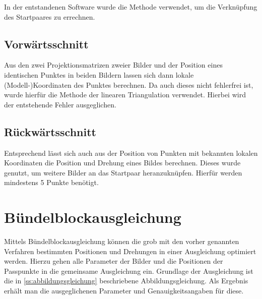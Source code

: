 \documentclass[./00PhotoBox.tex]{subfiles}
\begin{document}
In der entstandenen Software wurde die Methode verwendet, um die Verknüpfung des Startpaares zu errechnen.

\subsection{Vorwärtsschnitt}
Aus den zwei Projektionsmatrizen zweier Bilder und der Position eines identischen Punktes in beiden Bildern lassen sich dann lokale (Modell-)Koordinaten des Punktes berechnen. Da auch dieses nicht fehlerfrei ist, wurde hierfür die Methode der linearen Triangulation verwendet. Hierbei wird der entstehende Fehler ausgeglichen. \citep[S.312]{hartley}

\subsection{Rückwärtsschnitt}
Entsprechend lässt sich auch aus der Position von Punkten mit bekannten lokalen Koordinaten die Position und Drehung eines Bildes berechnen. Dieses wurde genutzt, um weitere Bilder an das Startpaar heranzuknüpfen. Hierfür werden mindestens 5 Punkte benötigt. \citep[S. 533ff]{hartley}


\section{Bündelblockausgleichung}
\label{s:buendelblock}
Mittels Bündelblockausgleichung können die grob mit den vorher genannten Verfahren bestimmten Positionen und Drehungen in einer Ausgleichung optimiert werden. Hierzu gehen alle Parameter der Bilder und die Positionen der Passpunkte in die gemeinsame Ausgleichung ein. Grundlage der Ausgleichung ist die in \autoref{ss:abbildungsgleichung} beschriebene Abbildungsgleichung. Als Ergebnis erhält man die ausgeglichenen Parameter und Genauigkeitsangaben für diese. \citep[S. 340]{luhmann4}

\biblio
\end{document}
